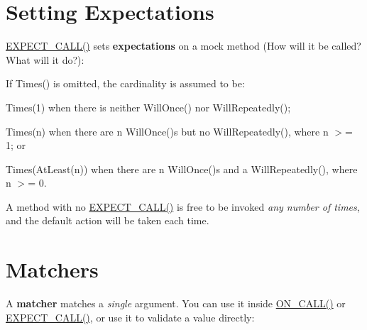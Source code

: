 \section*{Setting Expectations}

{\ttfamily \mbox{\hyperlink{googletest-master_2googlemock_2include_2gmock_2gmock-spec-builders_8h_a535a6156de72c1a2e25a127e38ee5232}{E\+X\+P\+E\+C\+T\+\_\+\+C\+A\+L\+L()}}} sets {\bfseries{expectations}} on a mock method (How will it be called? What will it do?)\+: 
\begin{DoxyCode}{0}
\end{DoxyCode}


If {\ttfamily Times()} is omitted, the cardinality is assumed to be\+:


\begin{DoxyItemize}
\item {\ttfamily Times(1)} when there is neither {\ttfamily Will\+Once()} nor {\ttfamily Will\+Repeatedly()};
\item {\ttfamily Times(n)} when there are {\ttfamily n Will\+Once()}s but no {\ttfamily Will\+Repeatedly()}, where {\ttfamily n} $>$= 1; or
\item {\ttfamily Times(\+At\+Least(n))} when there are {\ttfamily n Will\+Once()}s and a {\ttfamily Will\+Repeatedly()}, where {\ttfamily n} $>$= 0.
\end{DoxyItemize}

A method with no {\ttfamily \mbox{\hyperlink{googletest-master_2googlemock_2include_2gmock_2gmock-spec-builders_8h_a535a6156de72c1a2e25a127e38ee5232}{E\+X\+P\+E\+C\+T\+\_\+\+C\+A\+L\+L()}}} is free to be invoked {\itshape any number of times}, and the default action will be taken each time.

\section*{Matchers}

A {\bfseries{matcher}} matches a {\itshape single} argument. You can use it inside {\ttfamily \mbox{\hyperlink{googletest-master_2googlemock_2include_2gmock_2gmock-spec-builders_8h_a5b12ae6cf84f0a544ca811b380c37334}{O\+N\+\_\+\+C\+A\+L\+L()}}} or {\ttfamily \mbox{\hyperlink{googletest-master_2googlemock_2include_2gmock_2gmock-spec-builders_8h_a535a6156de72c1a2e25a127e38ee5232}{E\+X\+P\+E\+C\+T\+\_\+\+C\+A\+L\+L()}}}, or use it to validate a value directly\+:

